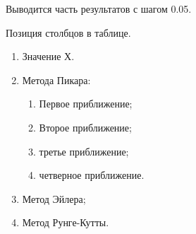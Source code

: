 Выводится часть результатов с шагом 0.05.

Позиция столбцов в таблице. 

\begin{enumerate}
	\item Значение Х.
	\item Метода Пикара:
	\begin{enumerate}
		\item Первое приближение;
		\item Второе приближение;
		\item третье приближение;
		\item четверное приближение.
	\end{enumerate}
	\item Метод Эйлера;
	\item Метод Рунге-Кутты.
\end{enumerate}

